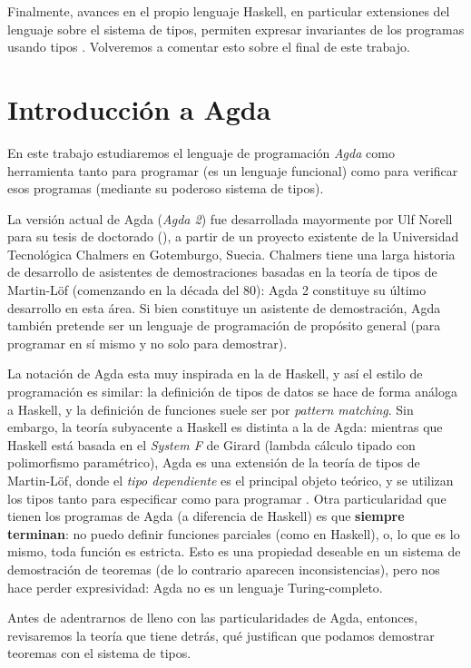 \documentclass[11pt]{article} %
\begin{document}
Finalmente, avances en el propio lenguaje Haskell, en particular extensiones del lenguaje sobre el sistema de tipos, permiten expresar invariantes de los programas usando tipos \cite{lindley2014hasochism}. Volveremos a comentar esto sobre el final de este trabajo.


\section{Introducción a Agda}
En este trabajo estudiaremos el lenguaje de programación \textit{Agda} como herramienta tanto para programar (es un lenguaje funcional) como para verificar esos programas (mediante su poderoso sistema de tipos).

La versión actual de Agda (\textit{Agda 2}) fue desarrollada mayormente por Ulf Norell para su tesis de doctorado (\cite{norell:thesis}), a partir de un proyecto existente de la Universidad Tecnológica Chalmers en Gotemburgo, Suecia. Chalmers tiene una larga historia de desarrollo de asistentes de demostraciones basadas en la teoría de tipos de Martin-Löf (comenzando en la década del 80): Agda 2 constituye su último desarrollo en esta área. Si bien constituye un asistente de demostración, Agda también pretende ser un lenguaje de programación de propósito general (para programar en sí mismo y no solo para demostrar).

La notación de Agda esta muy inspirada en la de Haskell, y así el estilo de programación es similar: la definición de tipos de datos se hace de forma análoga a Haskell, y la definición de funciones suele ser por \textit{pattern matching}. Sin embargo, la teoría subyacente a Haskell es distinta a la de Agda: mientras que Haskell está basada en el \textit{System F} de Girard (lambda cálculo tipado con polimorfismo paramétrico), Agda es una extensión de la teoría de tipos de Martin-Löf, donde el \textit{tipo dependiente} es el principal objeto teórico, y se utilizan los tipos tanto para especificar como para programar \cite{nordstrom1990programming}. Otra particularidad que tienen los programas de Agda (a diferencia de Haskell) es que \textbf{siempre terminan}: no puedo definir funciones parciales (como en Haskell), o, lo que es lo mismo, toda función es estricta. Esto es una propiedad deseable en un sistema de demostración de teoremas (de lo contrario aparecen inconsistencias), pero nos hace perder expresividad: Agda no es un lenguaje Turing-completo. 

Antes de adentrarnos de lleno con las particularidades de Agda, entonces, revisaremos la teoría que tiene detrás, qué justifican que podamos demostrar teoremas con el sistema de tipos.
\end{document}
